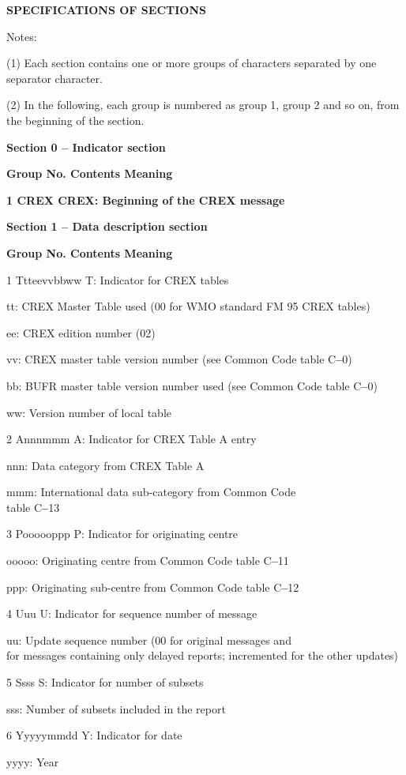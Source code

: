 \textbf{SPECIFICATIONS OF SECTIONS}

Notes:

(1) Each section contains one or more groups of characters separated by one separator character.

(2) In the following, each group is numbered as group 1, group 2 and so on, from the beginning of the section.

\textbf{Section 0 -- Indicator section}

\textbf{Group No. Contents Meaning}

\textbf{1 CREX CREX: Beginning of the CREX message}

\textbf{Section 1 -- Data description section}

\textbf{Group No. Contents Meaning}

1 Ttteevvbbww T: Indicator for CREX tables

tt: CREX Master Table used (00 for WMO standard FM 95 CREX tables)

ee: CREX edition number (02)

vv: CREX master table version number (see Common Code table C\textbf{--}0)

bb: BUFR master table version number used (see Common Code table C\textbf{--}0)

ww: Version number of local table

2 Annnmmm A: Indicator for CREX Table A entry

nnn: Data category from CREX Table A

mmm: International data sub-category from Common Code\\
table C\textbf{--}13

3 Poooooppp P: Indicator for originating centre

ooooo: Originating centre from Common Code table C\textbf{--}11

ppp: Originating sub-centre from Common Code table C\textbf{--}12

4 Uuu U: Indicator for sequence number of message

uu: Update sequence number (00 for original messages and\\
for messages containing only delayed reports; incremented for the other updates)

5 Ssss S: Indicator for number of subsets

sss: Number of subsets included in the report

6 Yyyyymmdd Y: Indicator for date

yyyy: Year

